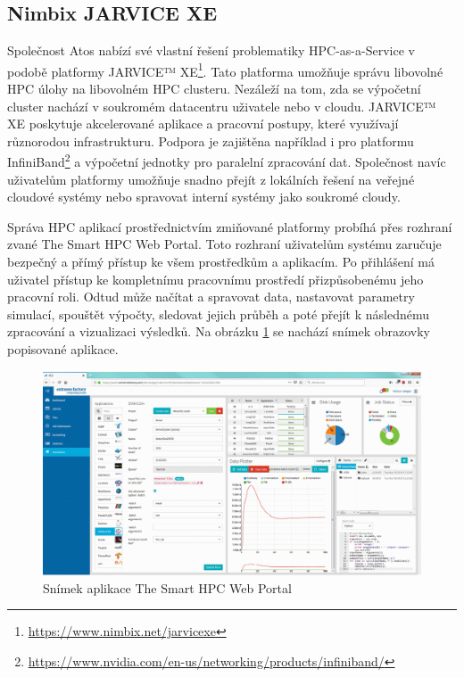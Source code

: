 \subsection{Nimbix JARVICE XE}
Společnost Atos nabízí své vlastní řešení problematiky HPC-as-a-Service v podobě platformy JARVICE™ XE\footnote{\href{https://www.nimbix.net/jarvicexe}{https://www.nimbix.net/jarvicexe}}. Tato platforma umožňuje správu libovolné HPC úlohy na libovolném HPC clusteru. Nezáleží na tom, zda se výpočetní cluster nachází v soukromém datacentru uživatele nebo v cloudu. JARVICE™ XE poskytuje akcelerované aplikace a pracovní postupy, které využívají různorodou infrastrukturu. Podpora je zajištěna například i pro platformu InfiniBand\footnote{\href{https://www.nvidia.com/en-us/networking/products/infiniband/}{https://www.nvidia.com/en-us/networking/products/infiniband/}} a výpočetní jednotky pro paralelní zpracování dat. Společnost navíc uživatelům platformy umožňuje snadno přejít z lokálních řešení na veřejné cloudové systémy nebo spravovat interní systémy jako soukromé cloudy. 

Správa HPC aplikací prostřednictvím zmiňované platformy probíhá přes rozhraní zvané The Smart HPC Web Portal. Toto rozhraní uživatelům systému zaručuje bezpečný a přímý přístup ke všem prostředkům a aplikacím. Po přihlášení má uživatel přístup ke kompletnímu pracovnímu prostředí přizpůsobenému jeho pracovní roli. Odtud může načítat a spravovat data, nastavovat parametry simulací, spouštět výpočty, sledovat jejich průběh a poté přejít k následnému zpracování a vizualizaci výsledků. Na obrázku \ref{fig:atos-dashboard} se nachází snímek obrazovky popisované aplikace.





\begin{figure}[!h]
	\centering
	\includegraphics[width=1\textwidth]{Figures/atos-dashboard.png}
	\caption{Snímek aplikace The Smart HPC Web Portal \cite{l9RorNxGDyQGAn8I}}
	\label{fig:atos-dashboard}
\end{figure}

